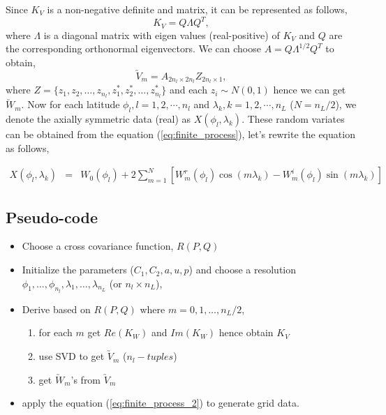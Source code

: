 	Since $K_V$ is a non-negative definite and matrix, it can be represented as follows,
	\[ K_V = Q\Lambda Q^T, \]
	where $\Lambda$ is a diagonal matrix with eigen values (real-positive) of $K_V$ and $Q$ are the corresponding orthonormal eigenvectors. We can choose $A = Q\Lambda^{1/2} Q^T$ to obtain,
	\[\utilde{V}_m=A_{2n_{l}\times 2n_{l}}Z_{2n_{l}\times 1},\]
	where $Z =\{z_1, z_2, \ldots, z_{n_l}, z_1^*, z_2^*, \ldots, z_{n_l}^*\}$ and each $z_i\sim N(0,1)$ hence we can get $\utilde{W}_m$.
	Now  for each latitude $\phi_l, l = 1, 2, \cdots, n_l$ and $\lambda_k, k = 1, 2, \cdots, n_L$ ($N = n_L/2$), we denote the axially symmetric data (real) as $X(\phi_l, \lambda_k)$. These random variates can be obtained from the equation (\ref{eq:finite_process}), let's rewrite the equation as follows,
		
	\begin{eqnarray} \label{eq:finite_process_2}
		X(\phi_l,\lambda_k) &=& W_0(\phi_l) + 2 \sum_{m =1}^N \left[W_m^r(\phi_l)\cos(m\lambda_k) - W_m^i(\phi_l)\sin(m \lambda_k)\right]
	\end{eqnarray}
		
	\subsection{Pseudo-code}
		
	\begin{itemize}
		\item Choose a cross covariance function, $R(P,Q)$
		\item Initialize the parameters ($C_1, C_2, a, u, p$) and choose a resolution $\phi_1,\ldots,\phi_{n_l}, \lambda_1, \ldots, \lambda_{n_L}$ (or $n_l\times n_L$),
		\item Derive \Cm based on $R(P,Q)$ where $m=0,1,\ldots,n_L/2$,
		      \begin{enumerate}
		      	\item for each $m$ get $Re(K_W)$ and $Im(K_W)$ hence obtain $K_V$
		      	\item use SVD to get $\utilde{V}_m$ ($n_l-tuples$)
		      	\item get $\utilde{W}_m$'s from $\utilde{V}_m$
		      \end{enumerate}
		      		      
		\item apply the equation (\ref{eq:finite_process_2}) to generate grid data.
	\end{itemize}
		

